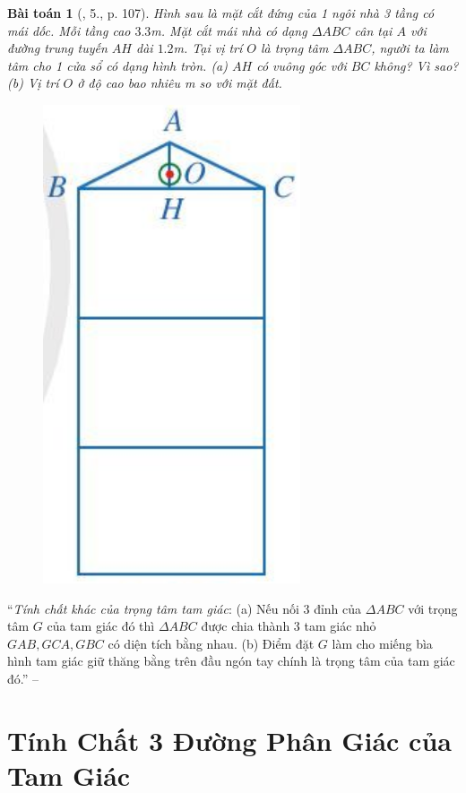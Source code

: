 \documentclass{article}
\newtheorem{baitoan}{Bài toán}
\begin{document}
\begin{baitoan}[\cite{SGK_Toan_7_Canh_Dieu_tap_2}, 5., p. 107]
	Hình sau là mặt cắt đứng của 1 ngôi nhà 3 tầng có mái dốc. Mỗi tầng cao $3.3$\emph{m}. Mặt cắt mái nhà có dạng $\Delta ABC$ cân tại $A$ với đường trung tuyến $AH$ dài $1.2$\emph{m}. Tại vị trí $O$ là trọng tâm $\Delta ABC$, người ta làm tâm cho 1 cửa sổ có dạng hình tròn. (a) $AH$ có vuông góc với $BC$ không? Vì sao? (b) Vị trí $O$ ở độ cao bao nhiêu \emph{m} so với mặt đất.
	\begin{figure}[H]
		\centering
		\includegraphics[scale=.25]{SGK_Toan_7_CD_107}
	\end{figure}
\end{baitoan}
\noindent``\textit{Tính chất khác của trọng tâm tam giác}: (a) Nếu nối 3 đỉnh của $\Delta ABC$ với trọng tâm $G$ của tam giác đó thì $\Delta ABC$ được chia thành 3 tam giác nhỏ $GAB,GCA,GBC$ có diện tích bằng nhau. (b) Điểm đặt $G$ làm cho miếng bìa hình tam giác giữ thăng bằng trên đầu ngón tay chính là trọng tâm của tam giác đó.'' -- \cite[p. 107]{SGK_Toan_7_Canh_Dieu_tap_2}


\section{Tính Chất 3 Đường Phân Giác của Tam Giác}
\end{document}
